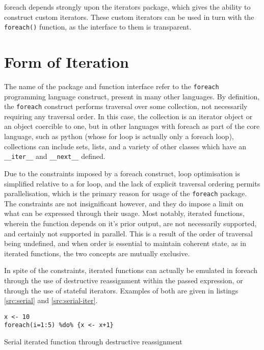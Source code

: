 \documentclass[a4paper,10pt]{article}
\begin{document}
foreach depends strongly upon the iterators package, which gives the
ability to construct custom iterators. These custom iterators can be
used in turn with the \texttt{foreach()} function, as the interface to
them is transparent.

\section{Form of Iteration}\label{sec:form-iter}

The name of the package and function interface refer to the \texttt{foreach}
programming language construct, present in many other languages.
By definition, the \texttt{foreach} construct performs traversal over some
collection, not necessarily requiring any traversal order.
In this case, the collection is an iterator object or an object coercible to
one, but in other languages with foreach as part of the core language, such as
python (whose for loop is actually only a foreach loop), collections can
include sets, lists, and a variety of other classes which have an
\texttt{\_\_iter\_\_} and \texttt{\_\_next\_\_} defined\cite{python2020iter}.

Due to the constraints imposed by a foreach construct, loop optimisation is
simplified relative to a for loop, and the lack of explicit traversal ordering
permits parallelisation, which is the primary reason for usage of the
\texttt{foreach} package.
The constraints are not insignificant however, and they do impose a limit on
what can be expressed through their usage.
Most notably, iterated functions, wherein the function depends on it's prior
output, are not necessarily supported, and certainly not supported in parallel.
This is a result of the order of traversal being undefined, and when order is
essential to maintain coherent state, as in iterated functions, the two
concepts are mutually exclusive.

In spite of the constraints, iterated functions can actually be emulated in
foreach through the use of destructive reassignment within the passed
expression, or through the use of stateful iterators.
Examples of both are given in listings \ref{src:serial} and \ref{src:serial-iter}.

\begin{listing}
\begin{verbatim}
x <- 10
foreach(i=1:5) %do% {x <- x+1}
\end{verbatim}
\caption{Serial iterated function through destructive reassignment}\label{src:serial}
\end{listing}
\end{document}
